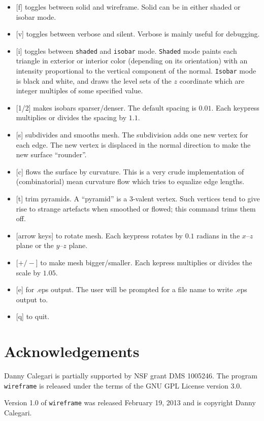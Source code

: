 \documentclass[12pt]{article}
\begin{document}
\begin{itemize}
\item{[f] toggles between solid and wireframe. Solid can be in either shaded or isobar mode.}
\item{[v] toggles between verbose and silent. Verbose is mainly useful for debugging.}
\item{[i] toggles between {\tt shaded} and {\tt isobar} mode. {\tt Shaded} mode paints each triangle in 
exterior or interior color (depending on its orientation) with an intensity proportional to the
vertical component of the normal. {\tt Isobar} mode is black and white, and draws the level
sets of the $z$ coordinate which are integer multiples of some specified value.}
\item{[1/2] makes isobars sparser/denser. The default spacing is $0.01$. Each keypress multiplies
or divides the spacing by $1.1$.}
\item{[s] subdivides and smooths mesh. The subdivision adds one new vertex for each edge. The new vertex
is displaced in the normal direction to make the new surface ``rounder''.}
\item{[c] flows the surface by curvature. This is a very crude implementation of (combinatorial) mean
curvature flow which tries to equalize edge lengths.}
\item{[t] trim pyramids. A ``pyramid'' is a 3-valent vertex. Such vertices tend to give rise to
strange artefacts when smoothed or flowed; this command trims them off.}
\item{[arrow keys] to rotate mesh. Each keypress rotates by $0.1$ radians in the $x$--$z$ plane or
the $y$--$z$ plane.}
\item{[$+/-$] to make mesh bigger/smaller. Each kepress multiplies or divides the scale by $1.05$.}
\item{[e] for .eps output. The user will be prompted for a file name to write .eps output to.}
\item{[q] to quit.}
\end{itemize}

\section{Acknowledgements}
Danny Calegari is partially supported by NSF grant DMS 1005246. The program {\tt wireframe} is
released under the terms of the GNU GPL License version 3.0.

\medskip

\noindent Version 1.0 of {\tt wireframe} was released February 19, 2013 and is copyright Danny Calegari.
\end{document}
